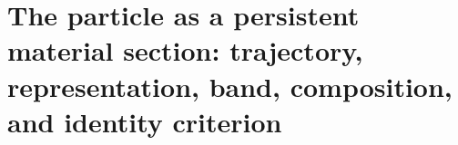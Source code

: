 \chapter{The particle as a persistent material section: trajectory, representation, band, composition, and identity criterion}
\label{chap:md-definicion-particula-definitiva}
\begingroup
\renewcommand{\chapter}[2][]{}%

\endgroup

